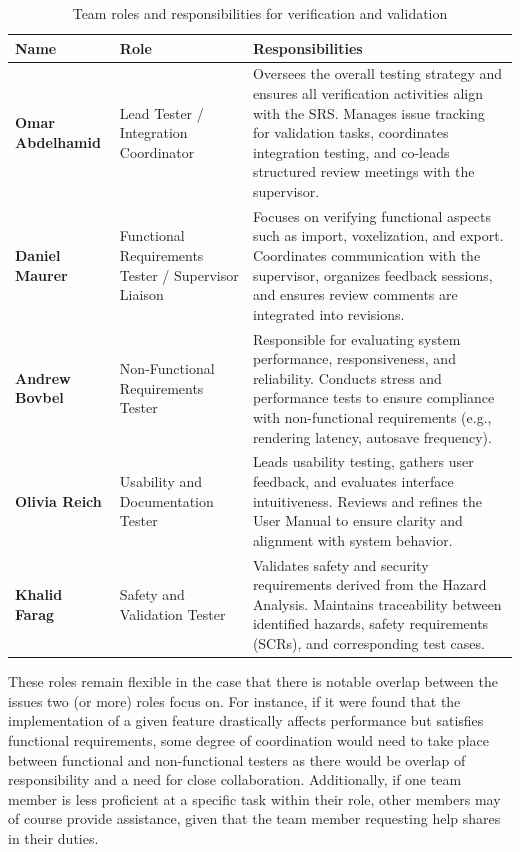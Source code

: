 \documentclass[12pt, titlepage]{article}
\begin{document}
\begin{table}[H]
\centering
\caption{Team roles and responsibilities for verification and validation}
\label{tab:roles}
\begin{tabular}{|p{3.5cm}|p{4cm}|p{7cm}|}
\hline
\textbf{Name} & \textbf{Role} & \textbf{Responsibilities} \\
\hline
\textbf{Omar Abdelhamid} & Lead Tester / Integration Coordinator & Oversees the overall testing strategy and ensures all verification activities align with the SRS. Manages issue tracking for validation tasks, coordinates integration testing, and co-leads structured review meetings with the supervisor. \\
\hline
\textbf{Daniel Maurer} & Functional Requirements Tester / Supervisor Liaison & Focuses on verifying functional aspects such as import, voxelization, and export. Coordinates communication with the supervisor, organizes feedback sessions, and ensures review comments are integrated into revisions. \\
\hline
\textbf{Andrew Bovbel} & Non-Functional Requirements Tester & Responsible for evaluating system performance, responsiveness, and reliability. Conducts stress and performance tests to ensure compliance with non-functional requirements (e.g., rendering latency, autosave frequency). \\
\hline
\textbf{Olivia Reich} & Usability and Documentation Tester & Leads usability testing, gathers user feedback, and evaluates interface intuitiveness. Reviews and refines the User Manual to ensure clarity and alignment with system behavior. \\
\hline
\textbf{Khalid Farag} & Safety and Validation Tester & Validates safety and security requirements derived from the Hazard Analysis. Maintains traceability between identified hazards, safety requirements (SCRs), and corresponding test cases. \\
\hline
\end{tabular}
\end{table}

\noindent These roles remain flexible in the case that there is notable overlap between the issues two (or more) roles focus on. For instance, if it were found that the implementation of a given feature drastically affects performance but satisfies functional requirements, some degree of coordination would need to take place between functional and non-functional testers as there would be overlap of responsibility and a need for close collaboration. Additionally, if one team member is less proficient at a specific task within their role, other members may of course provide assistance, given that the team member requesting help shares in their duties.\\
\end{document}

